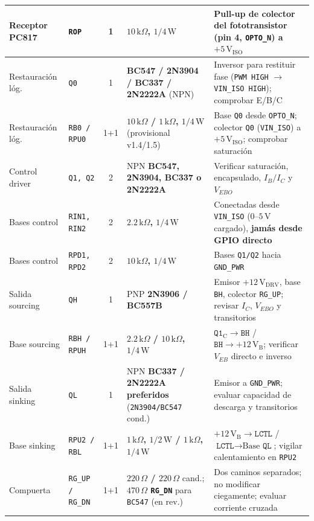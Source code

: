 \documentclass[10pt, a4paper, landscape]{article}
\begin{document}
{\begin{tabularx}{\linewidth}{|>{\raggedright\arraybackslash}p{2.5cm}|>{\raggedright\arraybackslash}p{2.2cm}|c|>{\raggedright\arraybackslash}p{7.4cm}|>{\raggedright\arraybackslash}X|}
Receptor PC817 & \texttt{ROP} & 1 & \textbf{$10\,\text{k}\Omega$, $1/4\,\text{W}$} & Pull-up de colector del fototransistor (pin 4, \texttt{OPTO\_N}) a $+5\,\text{V}_{\text{ISO}}$ \\ \hline
Restauración lóg. & \texttt{Q0} & 1 & \textbf{BC547 / 2N3904 / BC337 / 2N2222A} (NPN) & Inversor para restituir fase (\texttt{PWM HIGH} $\rightarrow$ \texttt{VIN\_ISO HIGH}); comprobar E/B/C \\ \hline
Restauración lóg. & \texttt{RB0 / RPU0} & 1+1 & \textbf{$10\,\text{k}\Omega$ / $1\,\text{k}\Omega$, $1/4\,\text{W}$} (provisional v1.4/1.5) & Base \texttt{Q0} desde \texttt{OPTO\_N}; colector \texttt{Q0} (\texttt{VIN\_ISO}) a $+5\,\text{V}_{\text{ISO}}$; comprobar saturación \\ \hline
Control driver & \texttt{Q1, Q2} & 2 & NPN \textbf{BC547, 2N3904, BC337 o 2N2222A} & Verificar saturación, encapsulado, $I_B/I_C$ y $V_{EBO}$ \\ \hline
Bases control & \texttt{RIN1, RIN2} & 2 & \textbf{$2.2\,\text{k}\Omega$, $1/4\,\text{W}$} & Conectadas desde \texttt{VIN\_ISO} ($0\text{--}5\,\text{V}$ cargado), \textbf{jamás desde GPIO directo} \\ \hline
Bases control & \texttt{RPD1, RPD2} & 2 & \textbf{$10\,\text{k}\Omega$, $1/4\,\text{W}$} & Bases \texttt{Q1/Q2} hacia \texttt{GND\_PWR} \\ \hline
Salida sourcing & \texttt{QH} & 1 & PNP \textbf{2N3906 / BC557B} & Emisor $+12\,\text{V}_{\text{DRV}}$, base \texttt{BH}, colector \texttt{RG\_UP}; revisar $I_C$, $V_{EBO}$ y transitorios \\ \hline
Base sourcing & \texttt{RBH / RPUH} & 1+1 & \textbf{$2.2\,\text{k}\Omega$ / $10\,\text{k}\Omega$, $1/4\,\text{W}$} & $\texttt{Q1}_{\text{C}} \rightarrow \texttt{BH}$ / $\texttt{BH} \rightarrow +12\,\text{V}_{\text{B}}$; verificar $V_{EB}$ directo e inverso \\ \hline
Salida sinking & \texttt{QL} & 1 & NPN \textbf{BC337 / 2N2222A preferidos} (\texttt{2N3904/BC547} cond.) & Emisor a \texttt{GND\_PWR}; evaluar capacidad de descarga y transitorios \\ \hline
Base sinking & \texttt{RPU2 / RBL} & 1+1 & \textbf{$1\,\text{k}\Omega$, $1/2\,\text{W}$ / $1\,\text{k}\Omega$, $1/4\,\text{W}$} & $+12\,\text{V}_{\text{B}} \rightarrow \texttt{LCTL}$ / $\texttt{LCTL} \rightarrow \text{Base }\texttt{QL}$; vigilar calentamiento en \texttt{RPU2} \\ \hline
Compuerta & \texttt{RG\_UP / RG\_DN} & 1+1 & \textbf{$220\,\Omega$ / $220\,\Omega$} cand.; \textbf{$470\,\Omega$ \texttt{RG\_DN}} para \texttt{BC547} (en rev.) & Dos caminos separados; no modificar ciegamente; evaluar corriente cruzada \\ \hline

\end{tabularx}}
\end{document}
